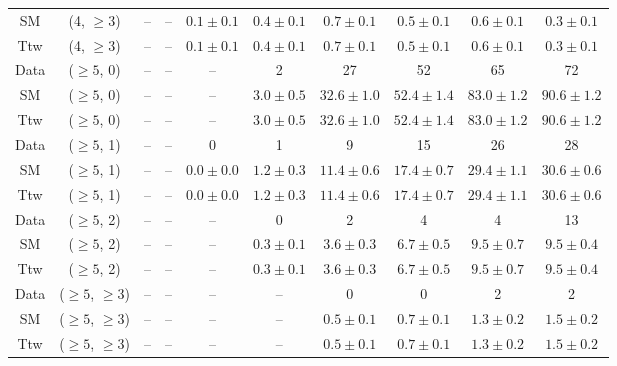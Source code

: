 \begin{table}[h!]
{\begin{tabular}{cccccccccc}
	SM & (4, $\ge3$) & -- & -- & $0.1\pm 0.1$ & $0.4\pm 0.1$ & $0.7\pm 0.1$ & $0.5\pm 0.1$ & $0.6\pm 0.1$ & $0.3\pm 0.1$ \\[0.5ex] 
	Ttw & (4, $\ge3$) & -- & -- & $0.1\pm 0.1$ & $0.4\pm 0.1$ & $0.7\pm 0.1$ & $0.5\pm 0.1$ & $0.6\pm 0.1$ & $0.3\pm 0.1$ \\[0.5ex] 
	Data & ($\ge5$, 0) & -- & -- & -- & 2 & 27 & 52 & 65 & 72 \\[0.5ex] 
	SM & ($\ge5$, 0) & -- & -- & -- & $3.0\pm 0.5$ & $32.6\pm 1.0$ & $52.4\pm 1.4$ & $83.0\pm 1.2$ & $90.6\pm 1.2$ \\[0.5ex] 
	Ttw & ($\ge5$, 0) & -- & -- & -- & $3.0\pm 0.5$ & $32.6\pm 1.0$ & $52.4\pm 1.4$ & $83.0\pm 1.2$ & $90.6\pm 1.2$ \\[0.5ex] 
	Data & ($\ge5$, 1) & -- & -- & 0 & 1 & 9 & 15 & 26 & 28 \\[0.5ex] 
	SM & ($\ge5$, 1) & -- & -- & $0.0\pm 0.0$ & $1.2\pm 0.3$ & $11.4\pm 0.6$ & $17.4\pm 0.7$ & $29.4\pm 1.1$ & $30.6\pm 0.6$ \\[0.5ex] 
	Ttw & ($\ge5$, 1) & -- & -- & $0.0\pm 0.0$ & $1.2\pm 0.3$ & $11.4\pm 0.6$ & $17.4\pm 0.7$ & $29.4\pm 1.1$ & $30.6\pm 0.6$ \\[0.5ex] 
	Data & ($\ge5$, 2) & -- & -- & -- & 0 & 2 & 4 & 4 & 13 \\[0.5ex] 
	SM & ($\ge5$, 2) & -- & -- & -- & $0.3\pm 0.1$ & $3.6\pm 0.3$ & $6.7\pm 0.5$ & $9.5\pm 0.7$ & $9.5\pm 0.4$ \\[0.5ex] 
	Ttw & ($\ge5$, 2) & -- & -- & -- & $0.3\pm 0.1$ & $3.6\pm 0.3$ & $6.7\pm 0.5$ & $9.5\pm 0.7$ & $9.5\pm 0.4$ \\[0.5ex] 
	Data & ($\ge5$, $\ge3$) & -- & -- & -- & -- & 0 & 0 & 2 & 2 \\[0.5ex] 
	SM & ($\ge5$, $\ge3$) & -- & -- & -- & -- & $0.5\pm 0.1$ & $0.7\pm 0.1$ & $1.3\pm 0.2$ & $1.5\pm 0.2$ \\[0.5ex] 
	Ttw & ($\ge5$, $\ge3$) & -- & -- & -- & -- & $0.5\pm 0.1$ & $0.7\pm 0.1$ & $1.3\pm 0.2$ & $1.5\pm 0.2$ \\[0.5ex] 
	\hline
	\hline
\end{tabular}}
\end{table}
